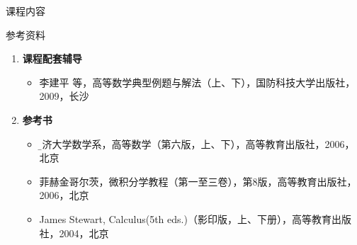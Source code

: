 \begin{frame}{课程内容}
	\linespread{1.5}\pause 
	\begin{center}
	\end{center}
\end{frame}

\begin{frame}{参考资料}
	\linespread{1.3}\pause 
	\begin{enumerate}
	  \item {\bf 课程配套辅导}
	  \begin{itemize}
	    \item \alert{李建平 等，高等数学典型例题与解法（上、下），国防科技大学出版社，2009，长沙}\pause 
	  \end{itemize}
	  \item {\bf 参考书}\pause 
	  \begin{itemize}
	    \item {\b 同济大学数学系，高等数学（第六版，上、下），高等教育出版社，2006，北京}\pause 
	    \item 菲赫金哥尔茨，微积分学教程（第一至三卷），第8版，高等教育出版社，2006，北京\pause 
	    \item James Stewart, Calculus(5th eds.)（影印版，上、下册），高等教育出版社，2004，北京\pause
	  \end{itemize}
	\end{enumerate}
\end{frame} 

